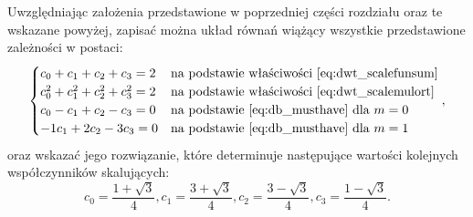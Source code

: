 Uwzględniając założenia przedstawione w poprzedniej części rozdziału oraz te wskazane powyżej, zapisać można układ równań wiążący wszystkie przedstawione zależności w postaci:
\begin{equation}
\begin{cases}
	c_{0} + c_{1} + c_{2} + c_{3} = 2                 & $na podstawie właściwości~\eqref{eq:dwt_scalefunsum}$ \\
	c_{0}^{2} + c_{1}^{2} + c_{2}^{2} + c_{3}^{2} = 2 & $na podstawie właściwości~\eqref{eq:dwt_scalemulort}$ \\
	c_{0} - c_{1} + c_{2} - c_{3} = 0                 & $na podstawie~\eqref{eq:db_musthave} dla $ m = 0 \\
	- 1 c_{1} + 2 c_{2} - 3 c_{3} = 0                 & $na podstawie~\eqref{eq:db_musthave} dla $ m = 1
\end{cases}
\label{eq:db2_system},
\end{equation}
oraz wskazać jego rozwiązanie, które determinuje następujące wartości kolejnych współczynników skalujących:
\begin{equation}
c_{0} = \frac{1 + \sqrt{3}}{4}, c_{1} = \frac{3 + \sqrt{3}}{4}, c_{2} = \frac{3 - \sqrt{3}}{4}, c_{3} = \frac{1 - \sqrt{3}}{4} \label{eq:db2_coefs}.
\end{equation}

